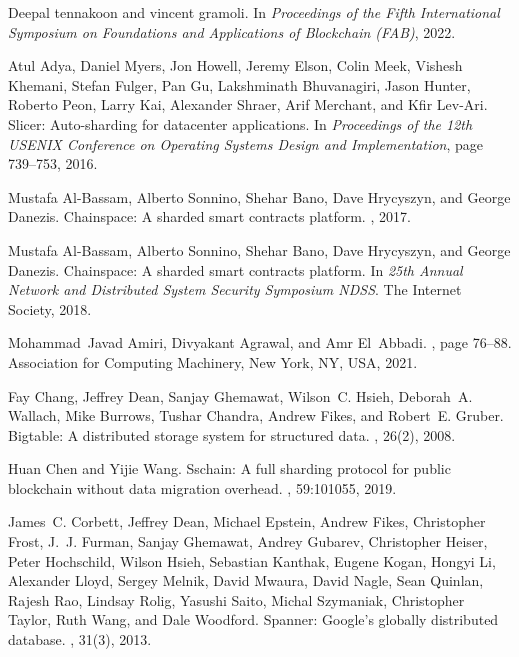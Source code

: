 \documentclass[11pt,dvipdfm]{article}
\begin{document}
\begin{thebibliography}{10}

Deepal tennakoon and vincent gramoli.
\newblock In {\em Proceedings of the Fifth International Symposium on
  Foundations and Applications of Blockchain (FAB)}, 2022.

Atul Adya, Daniel Myers, Jon Howell, Jeremy Elson, Colin Meek, Vishesh Khemani,
  Stefan Fulger, Pan Gu, Lakshminath Bhuvanagiri, Jason Hunter, Roberto Peon,
  Larry Kai, Alexander Shraer, Arif Merchant, and Kfir Lev-Ari.
\newblock Slicer: Auto-sharding for datacenter applications.
\newblock In {\em Proceedings of the 12th USENIX Conference on Operating
  Systems Design and Implementation}, page 739–753, 2016.

Mustafa Al-Bassam, Alberto Sonnino, Shehar Bano, Dave Hrycyszyn, and George
  Danezis.
\newblock Chainspace: A sharded smart contracts platform.
, 2017.

Mustafa Al{-}Bassam, Alberto Sonnino, Shehar Bano, Dave Hrycyszyn, and George
  Danezis.
\newblock Chainspace: {A} sharded smart contracts platform.
\newblock In {\em 25th Annual Network and Distributed System Security Symposium
  {NDSS}}. The Internet Society, 2018.

Mohammad~Javad Amiri, Divyakant Agrawal, and Amr El~Abbadi.
, page 76–88.
\newblock Association for Computing Machinery, New York, NY, USA, 2021.

Fay Chang, Jeffrey Dean, Sanjay Ghemawat, Wilson~C. Hsieh, Deborah~A. Wallach,
  Mike Burrows, Tushar Chandra, Andrew Fikes, and Robert~E. Gruber.
\newblock Bigtable: A distributed storage system for structured data.
, 26(2), 2008.

Huan Chen and Yijie Wang.
\newblock Sschain: A full sharding protocol for public blockchain without data
  migration overhead.
, 59:101055, 2019.

James~C. Corbett, Jeffrey Dean, Michael Epstein, Andrew Fikes, Christopher
  Frost, J.~J. Furman, Sanjay Ghemawat, Andrey Gubarev, Christopher Heiser,
  Peter Hochschild, Wilson Hsieh, Sebastian Kanthak, Eugene Kogan, Hongyi Li,
  Alexander Lloyd, Sergey Melnik, David Mwaura, David Nagle, Sean Quinlan,
  Rajesh Rao, Lindsay Rolig, Yasushi Saito, Michal Szymaniak, Christopher
  Taylor, Ruth Wang, and Dale Woodford.
\newblock Spanner: Google’s globally distributed database.
, 31(3), 2013.


\end{thebibliography}
\end{document}
